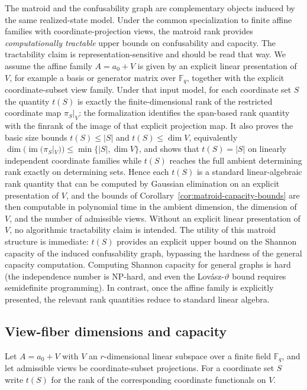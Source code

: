 The matroid and the confusability graph are complementary objects induced by the same realized-state model. Under the common specialization to finite affine families with coordinate-projection views, the matroid rank provides \emph{computationally tractable} upper bounds on confusability and capacity. The tractability claim is representation-sensitive and should be read that way. We assume the affine family $A=a_0+V$ is given by an explicit linear presentation of $V$, for example a basis or generator matrix over $\mathbb F_q$, together with the explicit coordinate-subset view family. Under that input model, for each coordinate set $S$ the quantity $t(S)$ is exactly the finite-dimensional rank of the restricted coordinate map $\pi_S|_V$: the formalization identifies the span-based rank quantity with the finrank of the image of that explicit projection map. It also proves the basic size bounds $t(S)\le |S|$ and $t(S)\le \dim V$, equivalently $\dim(\operatorname{im}(\pi_S|_V))\le \min\{|S|,\dim V\}$, and shows that $t(S)=|S|$ on linearly independent coordinate families while $t(S)$ reaches the full ambient determining rank exactly on determining sets. Hence each $t(S)$ is a standard linear-algebraic rank quantity that can be computed by Gaussian elimination on an explicit presentation of $V$, and the bounds of Corollary~\ref{cor:matroid-capacity-bounds} are then computable in polynomial time in the ambient dimension, the dimension of $V$, and the number of admissible views. Without an explicit linear presentation of $V$, no algorithmic tractability claim is intended. The utility of this matroid structure is immediate: $t(S)$ provides an explicit upper bound on the Shannon capacity of the induced confusability graph, bypassing the hardness of the general capacity computation. Computing Shannon capacity for general graphs is hard (the independence number is NP-hard, and even the Lovász-$\vartheta$ bound requires semidefinite programming). In contrast, once the affine family is explicitly presented, the relevant rank quantities reduce to standard linear algebra.

\subsection{View-fiber dimensions and capacity}
\label{sec:affine-to-graph}

Let $A=a_0+V$ with $V$ an $r$-dimensional linear subspace over a finite field $\mathbb{F}_q$, and let admissible views be coordinate-subset projections. For a coordinate set $S$ write $t(S)$ for the rank of the corresponding coordinate functionals on $V$.

